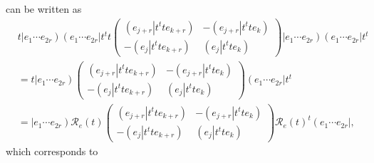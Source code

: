 \documentclass[aps,preprint]{revtex4}
\begin{document}
can be written as 
\begin{align}
& t\left\vert e_{1}\cdots e_{2r}\right) \left( e_{1}\cdots e_{2r}\right\vert
t^{t}t\left( 
\begin{array}{cc}
\left( \left. e_{j+r}\right\vert t^{t}te_{k+r}\right) & -\left( \left.
e_{j+r}\right\vert t^{t}te_{k}\right) \\ 
-\left( \left. e_{j}\right\vert t^{t}te_{k+r}\right) & \left( \left.
e_{j}\right\vert t^{t}te_{k}\right)%
\end{array}
\right) \left\vert e_{1}\cdots e_{2r}\right) \left( e_{1}\cdots
e_{2r}\right\vert t^{t} \\
& =t\left\vert e_{1}\cdots e_{2r}\right) \left( 
\begin{array}{cc}
\left( \left. e_{j+r}\right\vert t^{t}te_{k+r}\right) & -\left( \left.
e_{j+r}\right\vert t^{t}te_{k}\right) \\ 
-\left( \left. e_{j}\right\vert t^{t}te_{k+r}\right) & \left( \left.
e_{j}\right\vert t^{t}te_{k}\right)%
\end{array}
\right) \left( e_{1}\cdots e_{2r}\right\vert t^{t} \\
& =\left\vert e_{1}\cdots e_{2r}\right) \mathcal{R}_{e}\left( t\right)
\left( 
\begin{array}{cc}
\left( \left. e_{j+r}\right\vert t^{t}te_{k+r}\right) & -\left( \left.
e_{j+r}\right\vert t^{t}te_{k}\right) \\ 
-\left( \left. e_{j}\right\vert t^{t}te_{k+r}\right) & \left( \left.
e_{j}\right\vert t^{t}te_{k}\right)%
\end{array}
\right) \mathcal{R}_{e}\left( t\right) ^{t}\left( e_{1}\cdots
e_{2r}\right\vert ,
\end{align}
which corresponds to 
\end{document}
